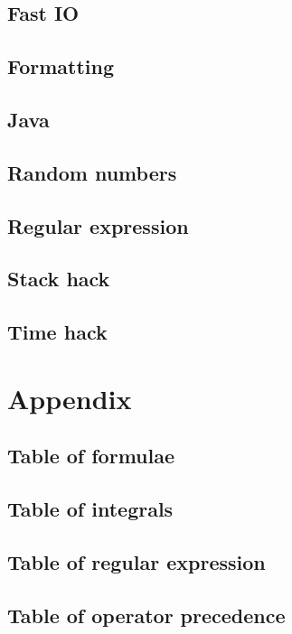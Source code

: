\documentclass[titlepage,a4paper,10pt]{article}
\begin{document}
\begin{multicols}{2}
\begin{spacing}{0.8}
{			\subsection{Fast IO}
				
			\subsection{Formatting}
				
			\subsection{Java}
				
			\subsection{Random numbers}
				
			\subsection{Regular expression}
				
			\subsection{Stack hack}
				
			\subsection{Time hack}
				
		\section{Appendix}
			\subsection{Table of formulae}
				
			\subsection{Table of integrals}
				
			\subsection{Table of regular expression}
				
			\subsection{Table of operator precedence}
				
		}
		\end{spacing}
		\endgroup
	\end{multicols}
\end{document}

